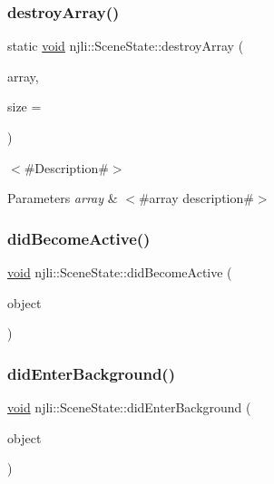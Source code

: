 \subsubsection{\texorpdfstring{destroy\+Array()}{destroyArray()}}
{\footnotesize\ttfamily static \mbox{\hyperlink{_thread_8h_af1e856da2e658414cb2456cb6f7ebc66}{void}} njli\+::\+Scene\+State\+::destroy\+Array (\begin{DoxyParamCaption}\item[{\mbox{\hyperlink{classnjli_1_1_scene_state}{Scene\+State}} $\ast$$\ast$}]{array,  }\item[{const \mbox{\hyperlink{_util_8h_a10e94b422ef0c20dcdec20d31a1f5049}{u32}}}]{size = {} }\end{DoxyParamCaption})\hspace{0.3cm}{\ttfamily [static]}}

$<$\#\+Description\#$>$


\begin{DoxyParams}{Parameters}
{\em array} & $<$\#array description\#$>$ \\
\hline
\end{DoxyParams}
\mbox{\label{classnjli_1_1_scene_state_ab9d94ea67665b6cd57396c3e383abfd3}} 
\subsubsection{\texorpdfstring{did\+Become\+Active()}{didBecomeActive()}}
{\footnotesize\ttfamily \mbox{\hyperlink{_thread_8h_af1e856da2e658414cb2456cb6f7ebc66}{void}} njli\+::\+Scene\+State\+::did\+Become\+Active (\begin{DoxyParamCaption}\item[{\mbox{\hyperlink{classnjli_1_1_scene}{Scene}} $\ast$}]{object }\end{DoxyParamCaption})}

\mbox{\label{classnjli_1_1_scene_state_a6b10e154bd9f688b1e2eabb7e3f4d60e}} 
\subsubsection{\texorpdfstring{did\+Enter\+Background()}{didEnterBackground()}}
{\footnotesize\ttfamily \mbox{\hyperlink{_thread_8h_af1e856da2e658414cb2456cb6f7ebc66}{void}} njli\+::\+Scene\+State\+::did\+Enter\+Background (\begin{DoxyParamCaption}\item[{\mbox{\hyperlink{classnjli_1_1_scene}{Scene}} $\ast$}]{object }\end{DoxyParamCaption})}

